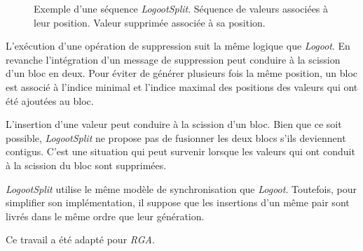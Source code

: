 \begin{figure}[tb]
\centering
\begin{subfigure}[b]{0.69\linewidth}
    \centering
    \caption{}\label{fig:logootsplit-1}
\end{subfigure}
\begin{subfigure}[b]{0.29\linewidth}
    \centering
    \caption{}\label{fig:logootsplit-2}
\end{subfigure}
\caption[Séquence \emph{LogootSplit}]{Exemple d'une séquence \emph{LogootSplit}.
 Séquence de valeurs associées à leur position.
 Valeur supprimée associée à sa position.}\label{fig:logootsplit}
\end{figure}

L'exécution d'une opération de suppression suit la même logique que \emph{Logoot}.
En revanche l'intégration d'un message de suppression peut conduire à la scission d'un bloc en deux.
Pour éviter de générer plusieurs fois la même position, un bloc est associé à l'indice minimal et l'indice maximal des positions des valeurs qui ont été ajoutées au bloc.

L'insertion d'une valeur peut conduire à la scission d'un bloc.
Bien que ce soit possible, \emph{LogootSplit} ne propose pas de fusionner les deux blocs s'ils deviennent contigus.
C'est une situation qui peut survenir lorsque les valeurs qui ont conduit à la scission du bloc sont supprimées.

\emph{LogootSplit} utilise le même modèle de synchronisation que \emph{Logoot}.
Toutefois, pour simplifier son implémentation, il suppose que les insertions d'un même pair sont livrés dans le même ordre que leur génération.

Ce travail a été adapté pour \emph{RGA}\autocite{briot_2016_rgasplit}.



